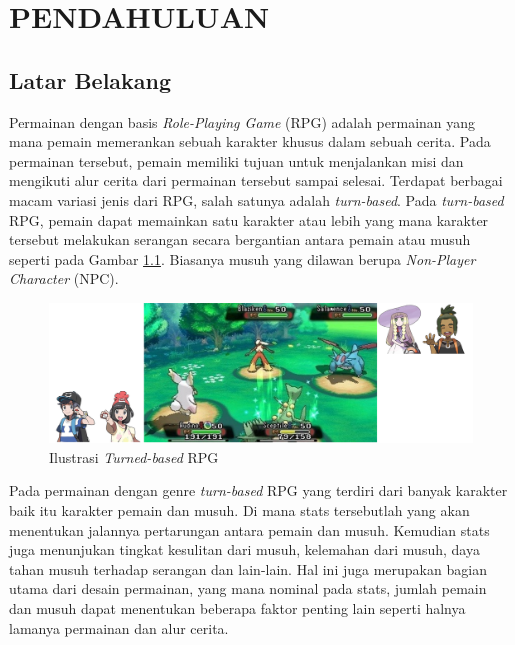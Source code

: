 \chapter{PENDAHULUAN}
\vspace{4ex}
\label{chap:chap1_introduction}

\section{Latar Belakang}
\vspace{1ex}

Permainan dengan basis \textit{Role-Playing Game} (RPG) adalah permainan yang mana pemain memerankan sebuah karakter khusus dalam sebuah cerita. Pada permainan tersebut, pemain memiliki tujuan untuk menjalankan misi dan mengikuti alur cerita dari permainan tersebut sampai selesai. Terdapat berbagai macam variasi jenis dari RPG, salah satunya adalah \textit{turn-based}. Pada \textit{turn-based} RPG, pemain dapat memainkan satu karakter atau lebih yang mana karakter tersebut melakukan serangan secara bergantian antara pemain atau musuh seperti pada Gambar \ref{fig:rpg_turn_based}. Biasanya musuh yang dilawan berupa \textit{Non-Player Character} (NPC).
\vspace{1ex}

\begin{figure} [!h] \centering
	\includegraphics[scale=0.40]{img/turn_based.png}
	\caption{Ilustrasi \textit{Turned-based} RPG}
	\label{fig:rpg_turn_based}
\end{figure}

Pada permainan dengan genre \textit{turn-based} RPG yang terdiri dari banyak karakter baik itu karakter pemain dan musuh. Di mana stats tersebutlah yang akan menentukan jalannya pertarungan antara pemain dan musuh. Kemudian stats juga menunjukan tingkat kesulitan dari musuh, kelemahan dari musuh, daya tahan musuh terhadap serangan dan lain-lain. Hal ini juga merupakan bagian utama dari desain permainan, yang mana nominal pada stats, jumlah pemain dan musuh dapat menentukan beberapa faktor penting lain seperti halnya lamanya permainan dan alur cerita. 
\vspace{1ex}

